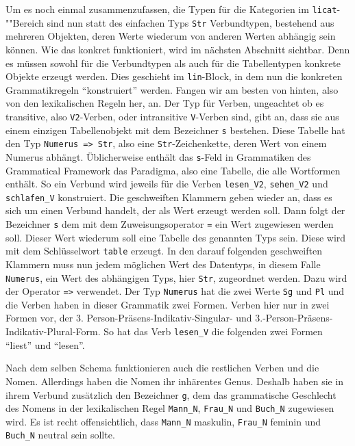 Um es noch einmal zusammenzufassen, die Typen für die Kategorien im \texttt{licat}-""Bereich sind nun statt des einfachen Typs \texttt{Str} Verbundtypen, bestehend aus mehreren Objekten, deren Werte wiederum von anderen Werten abhängig sein können. Wie das konkret funktioniert, wird im nächsten Abschnitt sichtbar. Denn es müssen sowohl für die Verbundtypen als auch für die Tabellentypen konkrete Objekte erzeugt werden. Dies geschieht im \texttt{lin}-Block, in dem nun die konkreten Grammatikregeln "`konstruiert"' werden. Fangen wir am besten von hinten, also von den lexikalischen Regeln her, an. Der Typ für Verben, ungeachtet ob es transitive, also \texttt{V2}-Verben, oder intransitive \texttt{V}-Verben sind, gibt an, dass sie aus einem einzigen Tabellenobjekt mit dem Bezeichner \texttt{s} bestehen. Diese Tabelle hat den Typ \texttt{Numerus => Str}, also eine \texttt{Str}-Zeichenkette, deren Wert von einem Numerus abhängt. Üblicherweise enthält das \texttt{s}-Feld in Grammatiken des Grammatical Framework das Paradigma, also eine Tabelle, die alle Wortformen enthält. So ein Verbund wird jeweils für die Verben \texttt{lesen\_V2}, \texttt{sehen\_V2} und \texttt{schlafen\_V} konstruiert. Die geschweiften Klammern geben wieder an, dass es sich um einen Verbund handelt, der als Wert erzeugt werden soll. Dann folgt der Bezeichner \texttt{s} dem mit dem Zuweisungsoperator \texttt{=} ein Wert zugewiesen werden soll. Dieser Wert wiederum soll eine Tabelle des genannten Typs sein. Diese wird mit dem Schlüsselwort \texttt{table} erzeugt. In den darauf folgenden geschweiften Klammern muss nun jedem möglichen Wert des Datentyps, in diesem Falle \texttt{Numerus}, ein Wert des abhängigen Typs, hier \texttt{Str}, zugeordnet werden. Dazu wird der Operator \texttt{=>} verwendet. Der Typ \texttt{Numerus} hat die zwei Werte \texttt{Sg} und \texttt{Pl} und die Verben haben in dieser Grammatik zwei Formen. Verben hier nur in zwei Formen vor, der 3. Person-Präsens-Indikativ-Singular- und 3.-Person-Präsens-Indikativ-Plural-Form. So hat das Verb \texttt{lesen\_V} die folgenden zwei Formen "`liest"' und "`lesen"'. \par
Nach dem selben Schema funktionieren auch die restlichen Verben und die Nomen. Allerdings haben die Nomen ihr inhärentes Genus. Deshalb haben sie in ihrem Verbund zusätzlich den Bezeichner \texttt{g}, dem das grammatische Geschlecht des Nomens in der lexikalischen Regel \texttt{Mann\_N}, \texttt{Frau\_N} und \texttt{Buch\_N} zugewiesen wird. Es ist recht offensichtlich, dass \texttt{Mann\_N} maskulin, \texttt{Frau\_N} feminin und \texttt{Buch\_N} neutral sein sollte. \par
